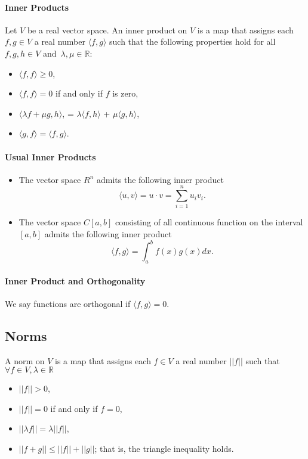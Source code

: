 \documentclass[12pt, letterpaper]{article}
\begin{document}
    \paragraph{Inner Products}
    Let \(V\) be a real vector space. An inner product on \(V\) is a map
    that assigns each \(f,g\in V\) a real number \(\langle f, g \rangle\)
    such that the following properties hold for all \(f, g, h \in V\) and\
    \(\lambda, \mu \in \mathbb{R}\):
    \begin{itemize}
        \item \(\langle f, f \rangle \geq 0\),
        \item \(\langle f, f \rangle = 0\) if and only if \(f\) is zero,
        \item \(\langle \lambda f + \mu g, h\rangle\),
        = \(\lambda\langle f, h\rangle\) + \(\mu\langle g, h\rangle\),
        \item \(\langle g, f \rangle = \langle f, g \rangle\).
    \end{itemize}

    \paragraph{Usual Inner Products}
    \begin{itemize}
        \item The vector space \(R^n\) admits the following inner product
        \[ 
            \langle u, v \rangle = u\cdot v = \sum_{i=1}^n u_i v_i.
        \]
        \item The vector space \(C[a, b]\) consisting of all continuous
        function on the interval \([a, b]\) admits the following inner product
        \[
            \langle f, g \rangle = \int_{a}^{b} f(x) g(x) dx.
        \]
    \end{itemize}

    \paragraph{Inner Product and Orthogonality}
    We say functions are orthogonal if \(\langle f, g\rangle = 0\).
    
    \subsection{Norms}
    A norm on \(V\) is a map that assigns each \(f\in V\) a real number
    \(||f||\) such that \(\forall f \in V, \lambda \in \mathbb{R}\)
    \begin{itemize}
        \item \(||f|| > 0\),
        \item \(||f|| = 0\) if and only if \(f = 0\),
        \item \(||\lambda f|| = \lambda ||f||\),
        \item \(||f + g|| \leq ||f|| + ||g||\); that is, the triangle inequality holds.
    \end{itemize}
    
\end{document}
